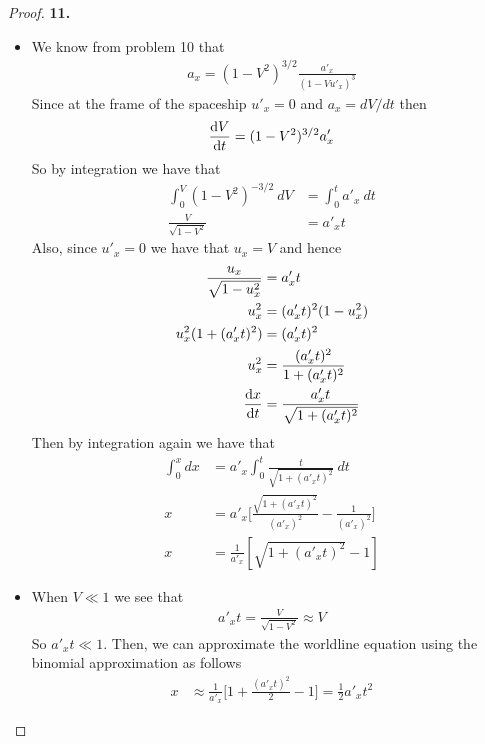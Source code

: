\documentclass[11pt]{article}
\theoremstyle{definition}
\begin{document}
\cleardoublepage
\begin{proof}{\textbf{11.}}
\begin{itemize}
\item [(a)] We know from problem 10 that
\begin{align*}
    a_x = (1 - V^2)^{3/2} \frac{a'_x}{(1 - Vu'_x)^3}
\end{align*}
Since at the frame of the spaceship $u'_x = 0$ and $a_x = dV/dt$ then
\begin{align*}
    \dv{V}{t} = (1 - V^2)^{3/2} a'_x
\end{align*}
So by integration we have that
\begin{align*}
    \int_{0}^V (1 - V^2)^{-3/2}~dV &= \int_0^t a'_x ~dt\\
    \frac{V}{\sqrt{1 -V^2}} &= a'_x t
\end{align*}
Also, since $u'_x = 0$ we have that $u_x = V$ and hence
\begin{align*}
    \frac{u_x}{\sqrt{1 -u_x^2}} &= a'_x t\\
    u_x^2 &= (a'_x t)^2(1 - u_x^2)\\
    u_x^2(1 + (a'_x t)^2) &= (a'_x t)^2\\
    u_x^2 &= \frac{(a'_x t)^2}{1 + (a'_x t)^2}\\
    \dv{x}{t} &= \frac{a'_x t}{\sqrt{1 + (a'_x t)^2}}
\end{align*}
Then by integration again we have that
\begin{align*}
    \int_0^x dx &= a'_x \int_0^t \frac{t}{\sqrt{1 + (a'_x t)^2}}~dt\\
    x &= a'_x \bigg[\frac{\sqrt{1 + (a'_x t)^2}}{(a'_x)^2} - \frac{1}{(a'_x)^2}\bigg]\\
    x &= \frac{1}{a'_x}[\sqrt{1 + (a'_x t)^2} - 1]
\end{align*}

\item [(b)] When $V \ll 1$ we see that
\begin{align*}
    a'_x t = \frac{V}{\sqrt{1 - V^2}} \approx V
\end{align*}
So $a'_x t \ll 1$. Then, we can approximate the worldline equation using the
binomial approximation as follows
\begin{align*}
    x &\approx \frac{1}{a'_x}\bigg[1 + \frac{(a'_x t)^2}{2} - 1\bigg]
    =\frac{1}{2}a'_x t^2
\end{align*}
\end{itemize}
\end{proof}
\end{document}
